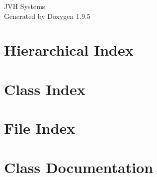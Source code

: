 \documentclass[twoside]{book}
\newcommand{\+}{\discretionary{\mbox{\scriptsize$\hookleftarrow$}}{}{}}
\newcommand{\clearemptydoublepage}{%
    \newpage{\pagestyle{empty}\cleardoublepage}%
  }
\begin{document}
  \raggedbottom
    \hypersetup{pageanchor=false,
                bookmarksnumbered=true,
                pdfencoding=unicode
               }
  \begin{titlepage}
  \vspace*{7cm}
  \begin{center}%
  {\Large JVH Systems}\\
  \vspace*{1cm}
  {\large Generated by Doxygen 1.9.5}\\
  \end{center}
  \end{titlepage}
  \clearemptydoublepage
  \tableofcontents
  \clearemptydoublepage
  \hypersetup{pageanchor=true}
\chapter{Hierarchical Index}

\chapter{Class Index}

\chapter{File Index}

\chapter{Class Documentation}




















\end{document}
